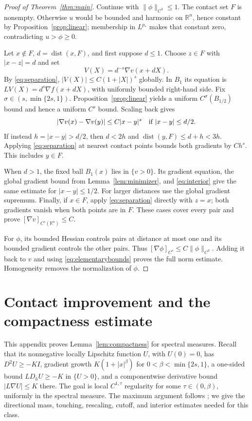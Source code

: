 \documentclass[11pt]{article}
\numberwithin{equation}{section}
\theoremstyle{remark}
\newcommand{\R}{\mathbb R}
\newcommand{\norm}[1]{\lVert #1\rVert}
\newcommand{\abs}[1]{\lvert #1\rvert}
\newcommand{\dist}{\operatorname{dist}}
\begin{document}
\begin{proof}[Proof of Theorem~\ref{thm:main}]
Continue with $\norm\phi_{C^3}\le1$. The contact set $F$ is nonempty. Otherwise $u$ would be bounded and harmonic on $\R^n$, hence constant by Proposition~\ref{prop:linear}; membership in $L^{p_*}$ makes that constant zero, contradicting $u>\phi\ge0$.

Let $x\notin F$, $d=\dist(x,F)$, and first suppose $d\le1$. Choose $z\in F$ with $\abs{x-z}=d$ and set
\[
 V(X)=d^{-s}\nabla v(x+dX).
\]
By \eqref{eq:separation}, $\abs{V(X)}\le C(1+\abs X)^s$ globally. In $B_1$ its equation is
$LV(X)=d^s\nabla f(x+dX)$, with uniformly bounded right-hand side. Fix $\sigma\in(s,\min\{2s,1\})$. Proposition~\ref{prop:linear} yields a uniform $C^\sigma(B_{1/2})$ bound and hence a uniform $C^s$ bound. Scaling back gives
\[
 \abs{\nabla v(x)-\nabla v(y)}\le C\abs{x-y}^s
 \quad\hbox{if }\abs{x-y}\le d/2.
\]
If instead $h=\abs{x-y}>d/2$, then $d<2h$ and $\dist(y,F)\le d+h<3h$. Applying \eqref{eq:separation} at nearest contact points bounds both gradients by $Ch^s$. This includes $y\in F$.

When $d>1$, the fixed ball $B_1(x)$ lies in $\{v>0\}$. Its gradient equation, the global gradient bound from Lemma~\ref{lem:minimizer}, and \eqref{eq:interior} give the same estimate for $\abs{x-y}\le1/2$. For larger distances use the global gradient supremum. Finally, if $x\in F$, apply \eqref{eq:separation} directly with $z=x$; both gradients vanish when both points are in $F$. These cases cover every pair and prove $[\nabla v]_{C^s(\R^n)}\le C$.

For $\phi$, its bounded Hessian controls pairs at distance at most one and its bounded gradient controls the other pairs. Thus $[\nabla\phi]_{C^s}\le C\norm\phi_{C^3}$. Adding it back to $v$ and using \eqref{eq:elementarybounds} proves the full norm estimate. Homogeneity removes the normalization of $\phi$.
\end{proof}

\appendix
\section{Contact improvement and the compactness estimate}\label{app:compactness}

This appendix proves Lemma~\ref{lem:compactness} for spectral measures. Recall that its nonnegative locally Lipschitz function $U$, with $U(0)=0$, has $D^2U\ge-KI$, gradient growth $K(1+\abs{x}^\beta)$ for $0<\beta<\min\{2s,1\}$, a one-sided bound $LD_hU\ge-K$ in $\{U>0\}$, and a componentwise derivative bound $\abs{L\nabla U}\le K$ there. The goal is local $C^{1,\tau}$ regularity for some $\tau\in(0,\beta)$, uniformly in the spectral measure. The maximum argument follows \cite[Lemma 3.9]{ROW}; we give the directional mass, touching, rescaling, cutoff, and interior estimates needed for this class.
\end{document}
